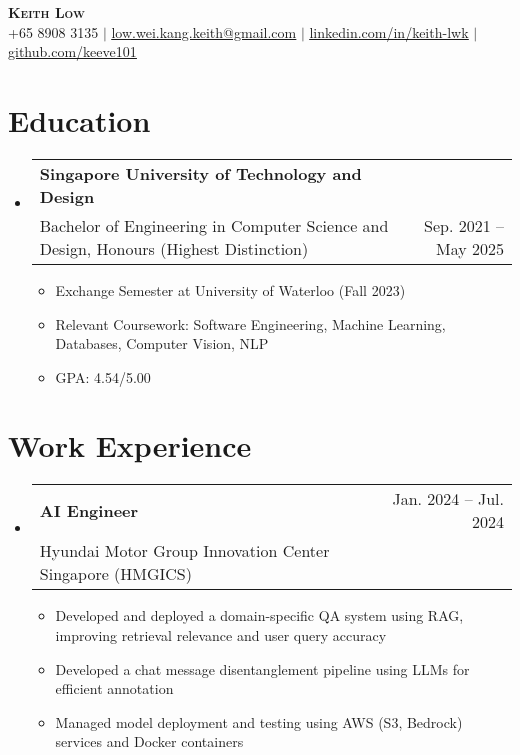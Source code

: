 \documentclass[letterpaper,11pt]{article}
\makeatletter
\newcommand{\resumeItem}[1]{
  \item\small{
    {#1 \vspace{-2pt}}
  }
}
\newcommand{\resumeSubheading}[4]{
  \vspace{-2pt}\item
    \begin{tabular*}{0.97\textwidth}[t]{l@{\extracolsep{\fill}}r}
      \textbf{#1} & #2 \\
      \textnormal{\small#3} & \textnormal{\small #4} \\
    \end{tabular*}\vspace{-7pt}
}
\newcommand{\resumeSubHeadingListStart}{\begin{itemize}[leftmargin=0.15in, label={}]}
\newcommand{\resumeSubHeadingListEnd}{\end{itemize}}
\newcommand{\resumeItemListStart}{\begin{itemize}}
\newcommand{\resumeItemListEnd}{\end{itemize}\vspace{-5pt}}
\makeatother
\begin{document}

\begin{center}
    \textbf{\Huge \scshape Keith Low} \\ \vspace{1pt}
    \small +65 8908 3135 $|$ \href{mailto:low.wei.kang.keith@gmail.com}{\underline{low.wei.kang.keith@gmail.com}} $|$ 
    \href{https://linkedin.com/in/keith-lwk}{\underline{linkedin.com/in/keith-lwk}} $|$
    \href{https://github.com/keeve101}{\underline{github.com/keeve101}}
\end{center}

\section{Education}
  \resumeSubHeadingListStart
    \resumeSubheading
      {Singapore University of Technology and Design}{}
      {Bachelor of Engineering in Computer Science and Design, Honours (Highest Distinction)}{Sep. 2021 -- May 2025}
      \resumeItemListStart
        \resumeItem{Exchange Semester at University of Waterloo (Fall 2023)}
        \resumeItem{Relevant Coursework: Software Engineering, Machine Learning, Databases, Computer Vision, NLP}
        \resumeItem{GPA: 4.54/5.00}
      \resumeItemListEnd
  \resumeSubHeadingListEnd
%

\section{Work Experience}
  \resumeSubHeadingListStart
    \resumeSubheading
      {AI Engineer}{Jan. 2024  -- Jul. 2024}
      {Hyundai Motor Group Innovation Center Singapore (HMGICS)}{}
      \resumeItemListStart
        \resumeItem{Developed and deployed a domain-specific QA system using RAG, improving retrieval relevance and user query accuracy}
        \resumeItem{Developed a chat message disentanglement pipeline using LLMs for efficient annotation}
        \resumeItem{Managed model deployment and testing using AWS (S3, Bedrock) services and Docker containers}
      \resumeItemListEnd
  \resumeSubHeadingListEnd
\end{document}
